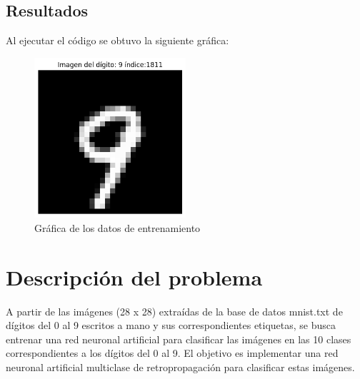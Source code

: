 \documentclass{article}
\begin{document}
    \subsection{Resultados}\label{subsec:resultados}
    Al ejecutar el código se obtuvo la siguiente gráfica:
    \begin{figure}[h]
        \centering
        \includegraphics[width=0.5\textwidth]{img/ramdom_mnist}
        \caption{Gráfica de los datos de entrenamiento}
        \label{fig:plot_training_data}
    \end{figure}

    \clearpage


    \section{Descripción del problema}\label{sec:descripcion-del-problema}
    A partir de las imágenes (28 x 28) extraídas de la base de datos mnist.txt de dígitos del 0 al 9 escritos a mano y sus correspondientes etiquetas,
    se busca entrenar una red neuronal artificial para clasificar las imágenes en las 10 clases correspondientes a los dígitos del 0 al 9.
    El objetivo es implementar una red neuronal artificial multiclase de retropropagación para clasificar estas imágenes.
\end{document}
